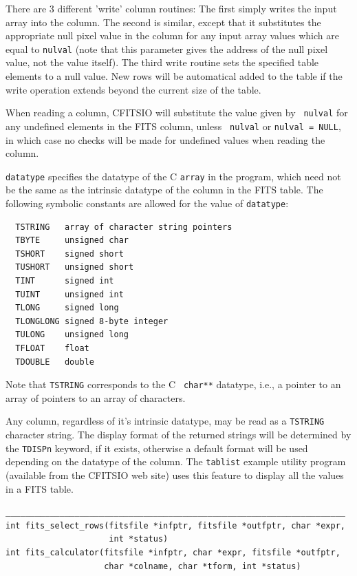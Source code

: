 \documentclass[11pt]{article}
\begin{document}
There are 3 different 'write' column routines:  The first simply writes
the input array into the column.  The second is similar, except that it
substitutes the appropriate null pixel value in the column for any
input array values which are equal to {\tt *nulval} (note that this
parameter gives the address of the null pixel value, not the value
itself).  The third write routine sets the specified table elements
to a null value.  New rows will be automatical added to the table
if the write operation extends beyond the current size of the table.

When reading a column, CFITSIO will substitute the value given by {\tt
nulval}  for  any undefined elements in the FITS column, unless {\tt
nulval} or {\tt *nulval = NULL}, in which case no checks will be made
for undefined values when reading the column.

{\tt datatype} specifies the datatype of the C {\tt array} in the program,
which need not be the same as the intrinsic datatype of the column in
the FITS table.   The following symbolic constants are allowed for the
value of {\tt datatype}:

\begin{verbatim}
  TSTRING   array of character string pointers
  TBYTE     unsigned char
  TSHORT    signed short
  TUSHORT   unsigned short
  TINT      signed int
  TUINT     unsigned int
  TLONG     signed long
  TLONGLONG signed 8-byte integer
  TULONG    unsigned long
  TFLOAT    float
  TDOUBLE   double
\end{verbatim}

Note that {\tt TSTRING} corresponds to the C {\tt
char**} datatype, i.e., a pointer to an array of pointers to an array
of characters.

Any column, regardless of it's intrinsic datatype, may be read as a
{\tt TSTRING} character string. The display format of the returned
strings will be determined by the {\tt TDISPn} keyword, if it exists,
otherwise a default format will be used depending on the datatype of
the column.  The {\tt tablist} example utility program (available from
the CFITSIO web site) uses this feature to display all the values in a
FITS table.

\begin{verbatim}
_____________________________________________________________________
int fits_select_rows(fitsfile *infptr, fitsfile *outfptr, char *expr,
                     int *status)
int fits_calculator(fitsfile *infptr, char *expr, fitsfile *outfptr,
                    char *colname, char *tform, int *status)
\end{verbatim}
\end{document}
